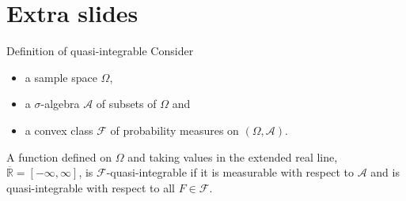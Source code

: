 \documentclass[xcolor=table]{beamer}
\begin{document}





  \begin{frame}[noframenumbering]

  {\tiny
  
  
  }

  \end{frame}

  \section*{Extra slides}

  
      \begin{frame}{Definition of quasi-integrable}
    Consider
    \begin{itemize}
    \item a sample space \(\Omega\),
    \item a \(\sigma\)-algebra \( {\mathcal {A}}\) of subsets of \(\Omega\) and 
    \item a convex class \({\mathcal {F}}\) of probability measures on  \({\displaystyle (\Omega ,{\mathcal {A}})}\).
    \end{itemize}

    \begin{definition}
        
     A function defined on \(\Omega\) and taking values in the extended real line, \({\displaystyle {\overline {\mathbb {R} }}=[-\infty ,\infty ]}\), is \({\mathcal {F}}\)-quasi-integrable if it is measurable with respect to \({\mathcal {A}}\) and is quasi-integrable with respect to all \(F\in {\mathcal {F}}\). 
    \end{definition}
\end{frame}
\end{document}
